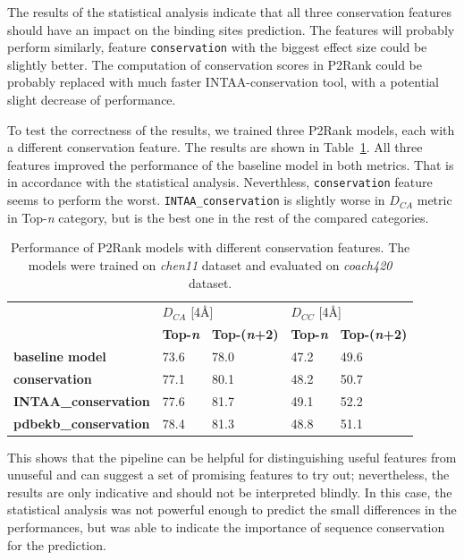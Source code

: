 The results of the statistical analysis indicate that all three conservation features should have an impact on the binding sites prediction. The features will probably perform similarly, feature \texttt{conservation} with the biggest effect size could be slightly better. The computation of conservation scores in P2Rank could be probably replaced with much faster INTAA-conservation tool, with a potential slight decrease of performance.

To test the correctness of the results, we trained three P2Rank models, each with a different conservation feature. The results are shown in Table~\ref{tab:P2Rankconservation}. All three features improved the performance of the baseline model in both metrics. That is in accordance with the statistical analysis. Neverthless, \texttt{conservation} feature seems to perform the worst. \texttt{INTAA\_conservation} is slightly worse in $D_{CA}$ metric in Top-\textit{n} category, but is the best one in the rest of the compared categories.  


\begin{table}[!h] \centering
\begin{tabular}{lllll}
\hline
\textbf{}                     & \multicolumn{2}{l}{$D_{CA}$ {[}4{\AA}{]}}   & \multicolumn{2}{l}{$D_{CC}$ {[}4{\AA}{]}}   \\
                              & \textbf{Top-\textit{n}} & \textbf{Top-(\textit{n}+2)} & \textbf{Top-\textit{n}} & \textbf{Top-(\textit{n}+2)} \\ \hline
\textbf{baseline model}        & 73.6           & 78.0                 & 47.2           & 49.6               \\
\textbf{conservation}         & 77.1           & 80.1               & 48.2           & 50.7               \\
\textbf{INTAA\_conservation}  & 77.6           & 81.7               & 49.1           & 52.2               \\
\textbf{pdbekb\_conservation} & 78.4           & 81.3               & 48.8           & 51.1               \\ \hline
\end{tabular}
\caption[Performance of P2Rank models with different conservation features]{Performance of P2Rank models with different conservation features. The models were trained on \textit{chen11} dataset and evaluated on \textit{coach420} dataset.}
\label{tab:P2Rankconservation}
\end{table}

This shows that the pipeline can be helpful for distinguishing useful features from unuseful and can suggest a set of promising features to try out; nevertheless, the results are only indicative and should not be interpreted blindly. In this case, the statistical analysis was not powerful enough to predict the small differences in the performances, but was able to indicate the importance of sequence conservation for the prediction.

